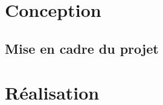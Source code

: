 \documentclass{book}
\begin{document}
  
  \frontmatter
  \tableofcontents
  
  \mainmatter
  \chapter{Conception}
  \section{Mise en cadre du projet}
  \chapter{Réalisation}
\end{document}
